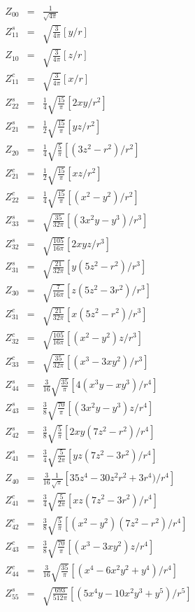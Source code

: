 \documentclass[twoside]{article}
\begin{document}
{\newpage\clearpage
{}%
\begin{eqnarray*}
Z_{00}&=&\frac{1}{\sqrt{4\pi}}\\
\hline
Z^s_{11}&=&\sqrt{\frac{3}{4\pi}}[y/r] \\
Z_{10}&=&\sqrt{\frac{3}{4\pi}}[z/r] \\
Z^c_{11}&=&\sqrt{\frac{3}{4\pi}}[x/r] \\
\hline
Z^s_{22}&=&\frac{1}{4}\sqrt{\frac{15}{\pi}}[2xy/r^2] \\
Z^s_{21}&=&\frac{1}{2}\sqrt{\frac{15}{\pi}}[yz/r^2] \\
Z_{20}&=&\frac{1}{4}\sqrt{\frac{5}{\pi}}[(3z^2-r^2)/r^2] \\
Z^c_{21}&=&\frac{1}{2}\sqrt{\frac{15}{\pi}}[xz/r^2] \\
Z^c_{22}&=&\frac{1}{4}\sqrt{\frac{15}{\pi}}[(x^2-y^2)/r^2] \\
\hline
Z^s_{33}&=&\sqrt{\frac{35}{32\pi}}[(3x^2y-y^3)/r^3] \\
Z^s_{32}&=&\sqrt{\frac{105}{16\pi}}[2xyz/r^3] \\
Z^s_{31}&=&\sqrt{\frac{21}{32\pi}}[y(5z^2-r^2)/r^3] \\
Z_{30}&=&\sqrt{\frac{7}{16\pi}}[z(5z^2-3r^2)/r^3] \\
Z^c_{31}&=&\sqrt{\frac{21}{32\pi}}[x(5z^2-r^2)/r^3] \\
Z^c_{32}&=&\sqrt{\frac{105}{16\pi}}[(x^2-y^2)z/r^3] \\
Z^c_{33}&=&\sqrt{\frac{35}{32\pi}}[(x^3-3xy^2)/r^3] \\
\hline
Z^s_{44}&=&\frac{3}{16}\sqrt{\frac{35}{\pi}}[4(x^3y-xy^3)/r^4] \\
Z^s_{43}&=&\frac{3}{8}\sqrt{\frac{70}{\pi}}[(3x^2y-y^3)z/r^4] \\
Z^s_{42}&=&\frac{3}{8}\sqrt{\frac{5}{\pi}}[2xy(7z^2-r^2)/r^4] \\
Z^s_{41}&=&\frac{3}{4}\sqrt{\frac{5}{2\pi}}[yz(7z^2-3r^2)/r^4] \\
Z_{40}&=&\frac{3}{16}\frac{1}{\sqrt{\pi}}[35z^4-30z^2r^2+3r^4)/r^4] \\
Z^c_{41}&=&\frac{3}{4}\sqrt{\frac{5}{2\pi}}[xz(7z^2-3r^2)/r^4] \\
Z^c_{42}&=&\frac{3}{8}\sqrt{\frac{5}{\pi}}[(x^2-y^2)(7z^2-r^2)/r^4] \\
Z^c_{43}&=&\frac{3}{8}\sqrt{\frac{70}{\pi}}[(x^3-3xy^2)z/r^4] \\
Z^c_{44}&=&\frac{3}{16}\sqrt{\frac{35}{\pi}}[(x^4-6x^2y^2+y^4)/r^4] \\
\hline
Z^s_{55}&=&\sqrt{\frac{693}{512\pi}}[(5x^4y-10x^2y^3+y^5)/r^5] \\

\end{eqnarray*}}
\end{document}
